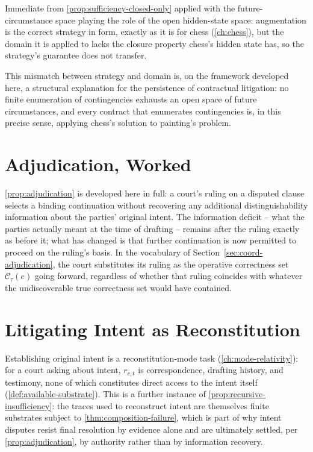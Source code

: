 \begin{proofsketch}
Immediate from \cref{prop:sufficiency-closed-only} applied with the
future-circumstance space playing the role of the open hidden-state
space: augmentation is the correct strategy in form, exactly as it is
for chess (\cref{ch:chess}), but the domain it is applied to lacks the
closure property chess's hidden state has, so the strategy's guarantee
does not transfer.
\end{proofsketch}

This mismatch between strategy and domain is, on the framework developed
here, a structural explanation for the persistence of contractual
litigation: no finite enumeration of contingencies exhausts an open
space of future circumstances, and every contract that enumerates
contingencies is, in this precise sense, applying chess's solution to
painting's problem.

\section{Adjudication, Worked}

\cref{prop:adjudication} is developed here in full: a court's ruling on a
disputed clause selects a binding continuation without recovering any
additional distinguishability information about the parties' original
intent. The information deficit -- what the parties actually meant at
the time of drafting -- remains after the ruling exactly as before it;
what has changed is that further continuation is now permitted to
proceed on the ruling's basis. In the vocabulary of
Section~\ref{sec:coord-adjudication}, the court substitutes its ruling as
the operative correctness set $\mathcal{C}_\tau(e)$ going forward,
regardless of whether that ruling coincides with whatever the
undiscoverable true correctness set would have contained.

\section{Litigating Intent as Reconstitution}

Establishing original intent is a reconstitution-mode task
(\cref{ch:mode-relativity}): for a court asking about intent, $r_{c,t}$
is correspondence, drafting history, and testimony, none of which
constitutes direct access to the intent itself
(\cref{def:available-substrate}). This is a further instance of
\cref{prop:recursive-insufficiency}: the traces used to reconstruct
intent are themselves finite substrates subject to
\cref{thm:composition-failure}, which is part of why intent disputes
resist final resolution by evidence alone and are ultimately settled,
per \cref{prop:adjudication}, by authority rather than by information
recovery.
